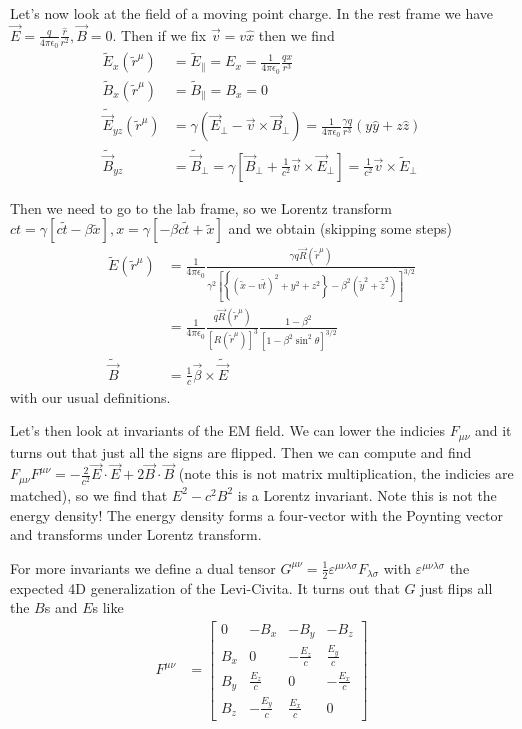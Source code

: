 \documentclass[10pt]{report}
\begin{document}
Let's now look at the field of a moving point charge. In the rest frame we have $\vec{E} = \frac{q}{4\pi\epsilon_0}\frac{\hat{r}}{r^2}, \vec{B} = 0$. Then if we fix $\vec{v} = v\hat{x}$ then we find
\begin{align}
    \tilde{E}_x(\tilde{r}^\mu) &= \tilde{E}_\parallel = E_x = \frac{1}{4\pi\epsilon_0}\frac{qx}{r^3}\\
    \tilde{B}_x(\tilde{r}^\mu) &= \tilde{B}_\parallel = B_x = 0\\
    \tilde{\vec{E}}_{yz}(\tilde{r}^\mu) &= \gamma\left( \vec{E}_{\perp} - \vec{v} \times \vec{B}_\perp \right) = \frac{1}{4\pi\epsilon_0}\frac{\gamma q}{r^3} \left( y\hat{y} + z\hat{z} \right)\\
    \tilde{\vec{B}}_{yz} &= \tilde{\vec{B}}_{\perp} = \gamma\left[ \vec{B}_{\perp} + \frac{1}{c^2}\vec{v} \times \vec{E}_\perp \right] = \frac{1}{c^2} \vec{v} \times \tilde{E}_\perp
\end{align}

Then we need to go to the lab frame, so we Lorentz transform $ct = \gamma \left[ c\tilde{t} - \beta \tilde{x} \right], x = \gamma\left[ -\beta c\tilde{t} + \tilde{x} \right]$ and we obtain (skipping some steps)
\begin{align}
    \tilde{E}(\tilde{r}^\mu) &= \frac{1}{4\pi\epsilon_0} \frac{\gamma q \vec{R}(\tilde{r}^\mu)}{\gamma^2\left[ \left\{ (\tilde{x} - v\tilde{t})^2 + y^2 + z^2 \right\} - \beta^2\left( \tilde{y}^2 + \tilde{z}^2 \right) \right]^{3/2}}\\
    &= \frac{1}{4\pi\epsilon_0}\frac{q\vec{R}(\tilde{r}^\mu)}{\left[ R(\tilde{r}^\mu) \right]^3}\frac{1 - \beta^2}{\left[ 1 - \beta^2\sin^2\theta \right]^{3/2}}\\
    \tilde{\vec{B}} &= \frac{1}{c}\vec{\beta} \times\tilde{\vec{E}}
\end{align}
with our usual definitions. 

Let's then look at invariants of the EM field. We can lower the indicies $F_{\mu \nu}$ and it turns out that just all the signs are flipped. Then we can compute and find $F_{\mu \nu}F^{\mu \nu} = -\frac{2}{c^2}\vec{E}\cdot \vec{E} + 2\vec{B} \cdot \vec{B}$ (note this is not matrix multiplication, the indicies are matched), so we find that $E^2 - c^2B^2$ is a Lorentz invariant. Note this is not the energy density! The energy density forms a four-vector with the Poynting vector and transforms under Lorentz transform.

For more invariants we define a dual tensor $G^{\mu \nu} = \frac{1}{2}\varepsilon^{\mu \nu \lambda \sigma}F_{\lambda \sigma}$ with $\varepsilon^{\mu \nu \lambda \sigma}$ the expected 4D generalization of the Levi-Civita. It turns out that $G$ just flips all the $B$s and $E$s like
\begin{align}
    F^{\mu \nu} &= \begin{bmatrix} 0 & -B_x & -B_y & -B_z\\[10pt]
        B_x & 0 & -\frac{E_z}{c} & \frac{E_y}{c}\\[10pt]
        B_y & \frac{E_z}{c} & 0 & -\frac{E_x}{c}\\[10pt]
        B_z & -\frac{E_y}{c} & \frac{E_x}{c} & 0\end{bmatrix} 
\end{align}
\end{document}
